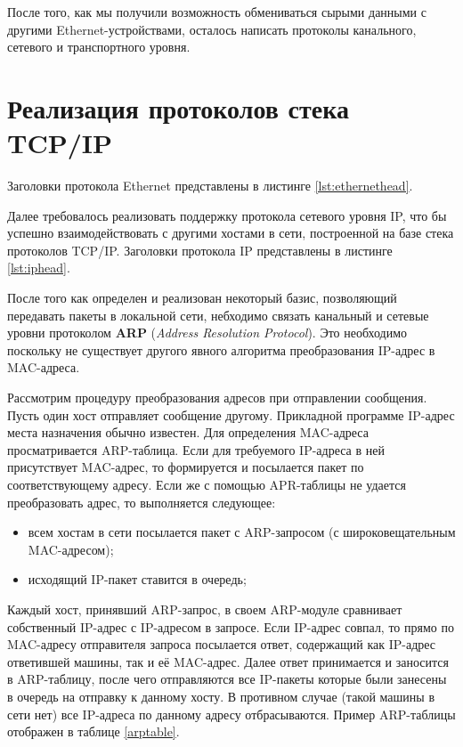 После того, как мы получили возможность обмениваться сырыми данными с другими Ethernet-устройствами, осталось написать протоколы канального, сетевого и транспортного уровня.

\section{Реализация протоколов стека TCP/IP}

Заголовки протокола Ethernet представлены в листинге \ref{lst:ethernethead}. 

{\small{}}

Далее требовалось реализовать поддержку протокола сетевого уровня IP, что бы успешно взаимодействовать с другими хостами в сети, построенной на базе стека протоколов TCP/IP.
Заголовки протокола IP представлены в листинге \ref{lst:iphead}.

{\small{}}

После того как определен и реализован некоторый базис, позволяющий передавать пакеты в локальной сети, небходимо связать канальный и сетевые уровни протоколом \textbf{ARP} (\textit{Address Resolution Protocol}). Это необходимо поскольку не существует другого явного алгоритма преобразования IP-адрес в MAC-адреса. 

Рассмотрим процедуру преобразования адресов при отправлении сообщения. Пусть один хост отправляет сообщение другому. Прикладной программе IP-адрес места назначения обычно известен. Для определения MAC-адреса просматривается ARP-таблица. Если для требуемого IP-адреса в ней присутствует MAC-адрес, то формируется и посылается пакет по соответствующему адресу. Если же с помощью APR-таблицы не удается преобразовать адрес, то выполняется следующее:
\begin{itemize}
	\item всем хостам в сети посылается пакет с ARP-запросом (с широковещательным MAC-адресом);
	\item исходящий IP-пакет ставится в очередь;
\end{itemize}

Каждый хост, принявший ARP-запрос, в своем ARP-модуле сравнивает собственный IP-адрес с IP-адресом в запросе. Если IP-адрес совпал, то прямо по MAC-адресу отправителя запроса посылается ответ, содержащий как IP-адрес ответившей машины, так и её MAC-адрес. Далее ответ принимается и заносится в ARP-таблицу, после чего отправляются все IP-пакеты которые были занесены в очередь на отправку к данному хосту. В противном случае (такой машины в сети нет) все IP-адреса по данному адресу отбрасываются. Пример ARP-таблицы отображен в таблице \ref{arptable}.

